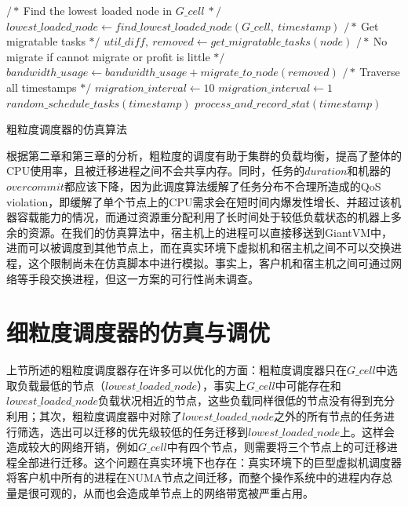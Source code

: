 \begin{algorithm}[h]
\begin{algorithmic}[1]
\State $/*\ $Find the lowest loaded node in $G\_cell\ */$
\State $lowest\_loaded\_node \gets find\_lowest\_loaded\_node(G\_cell,\  timestamp)$
\State $/*\ $Get migratable tasks $*/$
\State $util\_diff,\  removed \gets get\_migratable\_tasks(node)$
\State $/*\ $No migrate if cannot migrate or profit is little $*/$
\State $bandwidth\_usage \gets bandwidth\_usage + migrate\_to\_node(removed)$
\EndIf
\EndFor
\EndFor
\EndFunction
\State
\State $/*\ $Traverse all timestamps $*/$
\State $migration\_interval \gets 10$
\Else
\State $migration\_interval \gets 1$
\EndIf
\State $random\_schedule\_tasks(timestamp)$
\State
{}
\EndIf
\EndIf
\State $process\_and\_record\_stat(timestamp)$
\EndFor
\end{algorithmic}
\caption{粗粒度调度器的仿真算法}
\label{algo:simucoarse}
\end{algorithm}

根据第二章和第三章的分析，粗粒度的调度有助于集群的负载均衡，提高了整体的CPU使用率，且被迁移进程之间不会共享内存。同时，任务的$duration$和机器的$overcommit$都应该下降，因为此调度算法缓解了任务分布不合理所造成的QoS violation，即缓解了单个节点上的CPU需求会在短时间内爆发性增长、并超过该机器容载能力的情况，而通过资源重分配利用了长时间处于较低负载状态的机器上多余的资源。在我们的仿真算法中，宿主机上的进程可以直接移送到GiantVM中，进而可以被调度到其他节点上，而在真实环境下虚拟机和宿主机之间不可以交换进程，这个限制尚未在仿真脚本中进行模拟。事实上，客户机和宿主机之间可通过网络等手段交换进程，但这一方案的可行性尚未调查。

\section{细粒度调度器的仿真与调优}
上节所述的粗粒度调度器存在许多可以优化的方面：粗粒度调度器只在$G\_cell$中选取负载最低的节点（$lowest\_loaded\_node$），事实上$G\_cell$中可能存在和$lowest\_loaded\_node$负载状况相近的节点，这些负载同样很低的节点没有得到充分利用；其次，粗粒度调度器中对除了$lowest\_loaded\_node$之外的所有节点的任务进行筛选，选出可以迁移的优先级较低的任务迁移到$lowest\_loaded\_node$上。这样会造成较大的网络开销，例如$G\_cell$中有四个节点，则需要将三个节点上的可迁移进程全部进行迁移。这个问题在真实环境下也存在：真实环境下的巨型虚拟机调度器将客户机中所有的进程在NUMA节点之间迁移，而整个操作系统中的进程内存总量是很可观的，从而也会造成单节点上的网络带宽被严重占用。

